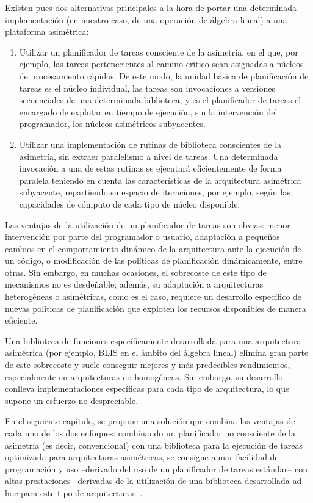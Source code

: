 Existen pues dos alternativas principales a la hora de portar una determinada implementación (en nuestro caso, de una operación
de álgebra lineal) a una plataforma asimétrica:

\begin{enumerate}
 \item Utilizar un planificador de tareas consciente de la asimetría, en el que, por ejemplo, las tareas pertenecientes al camino crítico 
	 sean asignadas a núcleos de procesamiento rápidos. De este modo, la unidad básica de planificación de tareas es el núcleo individual,
		las tareas son invocaciones a versiones secuenciales de una determinada biblioteca, 
		y es el planificador de tareas el encargado de explotar en tiempo de ejecución, sin la intervención del programador, los
		núcleos asimétricos subyacentes.
		
	\item Utilizar una implementación de rutinas de biblioteca conscientes de la asimetría, sin extraer paralelismo a nivel de tareas. Una
		determinada invocación a una de estas rutinas se ejecutará eficientemente de forma paralela teniendo en cuenta las 
		características de la arquitectura asimétrica subyacente, repartiendo su espacio de iteraciones, por ejemplo, según las
		capacidades de cómputo de cada tipo de núcleo disponible.
\end{enumerate}

Las ventajas de la utilización de un planificador de tareas son obvias: menor intervención por parte del programador o usuario,
adaptación a pequeños cambios en el comportamiento dinámico de la arquitectura ante la ejecución de un código, o modificación
de las políticas de planificación dinámicamente, entre otras. Sin embargo, en muchas ocasiones, el sobrecoste de este tipo de
mecanismos no es desdeñable; además, su adaptación a arquitecturas heterogéneas o asimétricas, como es el caso, requiere
un desarrollo específico de nuevas políticas de planificación que exploten los recursos disponibles de manera eficiente.

Una biblioteca de funciones específicamente desarrollada para una arquitectura asimétrica (por ejemplo, BLIS en el ámbito del álgebra lineal) elimina gran parte
de este sobrecoste y suele conseguir mejores y más predecibles rendimientos, especialmente en arquitecturas no homogéneas. Sin
embargo, su desarrollo conlleva implementaciones específicas para cada tipo de arquitectura, lo que supone un esfuerzo no despreciable.

En el siguiente capítulo, se propone una solución que combina las ventajas
de cada uno de los dos enfoques: combinando un planificador no consciente
de la asimetría (es decir, convencional) con una biblioteca para la
ejecución de tareas optimizada para arquitecturas asimétricas, se consigue
aunar facilidad de programación y uso --derivado del uso de un planificador
de tareas estándar-- con altas prestaciones --derivadas de la utilización
de una biblioteca desarrollada ad-hoc para este tipo de arquitecturas--.

